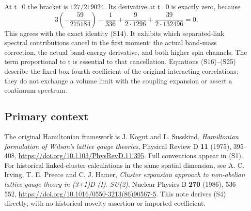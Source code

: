 At t=0 the bracket is \(127/219024\). Its derivative at t=0 is exactly zero, because \[
3\left(-\frac{59}{275184}\right)-\frac1{336}
 +\frac{9}{2\cdot1296}+\frac{39}{2\cdot132496}=0.
\tag{S25}
\] This agrees with the exact identity (S14). It exhibits which separated-link spectral contributions cancel in the first moment: the actual band-mass correction, the actual band-energy derivative, and both higher spin channels. The term proportional to t is essential to that cancellation. Equations (S16)--(S25) describe the fixed-box fourth coefficient of the original interacting correlations; they do not exchange a volume limit with the coupling expansion or assert a continuum spectrum.

\subsection{Primary context}\label{primary-context}

The original Hamiltonian framework is J. Kogut and L. Susskind, \emph{Hamiltonian formulation of Wilson's lattice gauge theories}, Physical Review D \textbf{11} (1975), 395--408, \url{https://doi.org/10.1103/PhysRevD.11.395}. Full conventions appear in (S1). For historical linked-cluster calculations in the same spatial dimension, see A. C. Irving, T. E. Preece and C. J. Hamer, \emph{Cluster expansion approach to non-abelian lattice gauge theory in (3+1)D (I). SU(2)}, Nuclear Physics B \textbf{270} (1986), 536--552, \url{https://doi.org/10.1016/0550-3213(86)90567-5}. This note derives (S4) directly, with no historical novelty assertion or imported coefficient.
